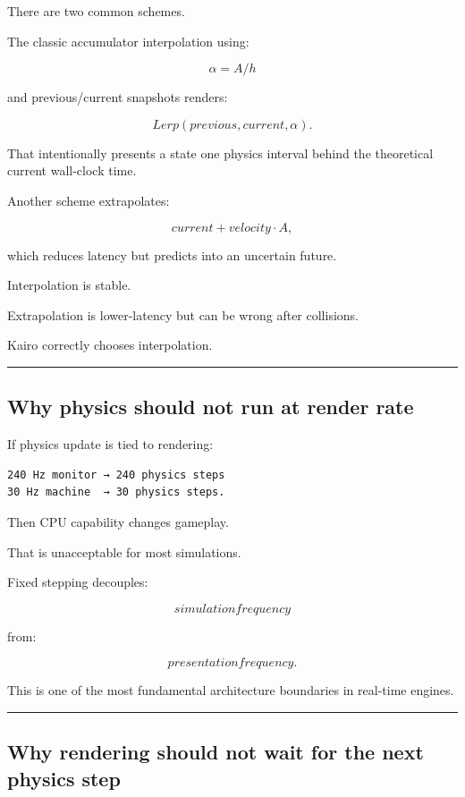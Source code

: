 There are two common schemes.

The classic accumulator interpolation using:

\[
\alpha=A/h
\]

and previous/current snapshots renders:

\[
Lerp(previous,current,\alpha).
\]

That intentionally presents a state one physics interval behind the theoretical current wall-clock time.

Another scheme extrapolates:

\[
current + velocity\cdot A,
\]

which reduces latency but predicts into an uncertain future.

Interpolation is stable.

Extrapolation is lower-latency but can be wrong after collisions.

Kairo correctly chooses interpolation.

\begin{center}\rule{0.5\linewidth}{0.5pt}\end{center}

\subsection{Why physics should not run at render rate}\label{06-engine-ii-ch038-why-physics-should-not-run-at-render-rate}

If physics update is tied to rendering:

\begin{verbatim}
240 Hz monitor → 240 physics steps
30 Hz machine  → 30 physics steps.
\end{verbatim}

Then CPU capability changes gameplay.

That is unacceptable for most simulations.

Fixed stepping decouples:

\[
\boxed{
simulation frequency
}
\]

from:

\[
\boxed{
presentation frequency.
}
\]

This is one of the most fundamental architecture boundaries in real-time engines.

\begin{center}\rule{0.5\linewidth}{0.5pt}\end{center}

\subsection{Why rendering should not wait for the next physics step}\label{06-engine-ii-ch038-why-rendering-should-not-wait-for-the-next-physics-step}

